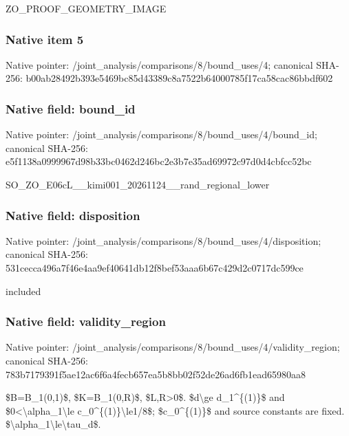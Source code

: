 \documentclass[10pt,a4paper]{article}
\begin{document}
ZO\_PROOF\_GEOMETRY\_IMAGE


\subsubsection{Native item 5}


Native pointer: /joint\_analysis/comparis\allowbreak{}ons/8/bound\_uses/4; canonical SHA-256: b00ab28492b393e5469bc85d\allowbreak{}43389c8a7522b64000785f17\allowbreak{}ca58cac86bbdf602



\subsubsection{Native field: bound\_id}


Native pointer: /joint\_analysis/comparis\allowbreak{}ons/8/bound\_uses/4/bound\allowbreak{}\_id; canonical SHA-256: e5f1138a0999967d98b33bc0\allowbreak{}462d246bc2e3b7e35ad69972\allowbreak{}c97d0d4cbfcc52bc


SO\_ZO\_E06cL\_\_kimi001\_202\allowbreak{}61124\_\_rand\_regional\_low\allowbreak{}er


\subsubsection{Native field: disposition}


Native pointer: /joint\_analysis/comparis\allowbreak{}ons/8/bound\_uses/4/dispo\allowbreak{}sition; canonical SHA-256: 531cecca496a7f46e4aa9ef4\allowbreak{}0641db12f8bef53aaa6b67c4\allowbreak{}29d2c0717dc599ce


included


\subsubsection{Native field: validity\_region}


Native pointer: /joint\_analysis/comparis\allowbreak{}ons/8/bound\_uses/4/valid\allowbreak{}ity\_region; canonical SHA-256: 783b7179391f5ae12ac6f6a4\allowbreak{}fecb657ea5b8bb02f52de26a\allowbreak{}d6fb1ead65980aa8


\$B=B\_1(0,1)\$, \$K=B\_1(0,R)\$, \$L,R>0\$. \$d\textbackslash{}ge d\_1\textasciicircum{}\{(1)\}\$ and \$0<\textbackslash{}alpha\_1\textbackslash{}le c\_0\textasciicircum{}\{(1)\}\textbackslash{}le1/8\$; \$c\_0\textasciicircum{}\{(1)\}\$ and source constants are fixed. \$\textbackslash{}alpha\_1\textbackslash{}le\textbackslash{}tau\_d\$.
\end{document}
